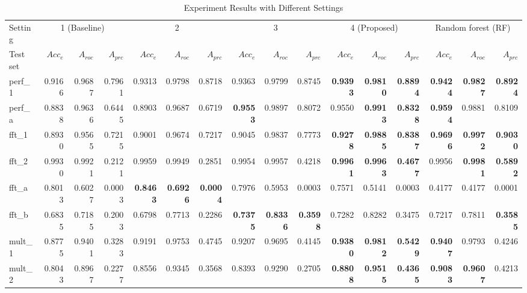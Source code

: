 \documentclass[10pt, final, letter, twocolumns]{IEEEtran}
\begin{document}
\begin{table}
\scriptsize
\centering
\caption{Experiment Results with Different Settings}\vspace{-3mm}
\label{tab:results}
\begin{tabular}{l|rrr|rrr|rrr|rrr||rrr}
\toprule
Setting & \multicolumn{3}{c|}{1 (Baseline)} & \multicolumn{3}{c|}{2} & \multicolumn{3}{c|}{3} & \multicolumn{3}{c||}{4 (Proposed)} & \multicolumn{3}{c}{Random forest (RF)}\\
Test set & $Acc_{e}$ & $A_{roc}$ & $A_{prc}$ & $Acc_{e}$ & $A_{roc}$ & $A_{prc}$ & $Acc_{e}$ & $A_{roc}$ & $A_{prc}$ & $Acc_{e}$ & $A_{roc}$ & $A_{prc}$ & $Acc_{e}$ & $A_{roc}$ & $A_{prc}$ \\
\midrule
perf\_1 & 0.9166&       0.9687& 0.7961& 0.9313& 0.9798& 0.8718  &0.9363&        0.9799& 0.8745  &{\bf 0.9393} &{\bf 0.9810}   &{\bf 0.8894} & {\bf 0.9424}& {\bf 0.9827}&   {\bf 0.8924}\\
perf\_a & 0.8838&       0.9636& 0.6445& 0.8903& 0.9687& 0.6719& {\bf 0.9553}    &0.9897&        0.8072& 0.9550  &{\bf 0.9913}&        {\bf 0.8328} & {\bf 0.9594}  &0.9881 &       0.8109\\
fft\_1 & 0.8930 &       0.9565  &0.7215 &0.9001 &0.9674 &0.7217 &0.9045 &0.9837 &0.7773 &{\bf 0.9278}&        {\bf 0.9885}    &{\bf 0.8387} & {\bf 0.9696}   & {\bf 0.9972}  & {\bf 0.9030}\\
fft\_2 & 0.9930 &0.9921 &0.2121 &0.9959 &0.9949 &0.2851 &0.9954 &0.9957 &0.4218 &{\bf 0.9961} &{\bf 0.9963}   &{\bf 0.4677} & 0.9956 & {\bf 0.9981}  & {\bf 0.5892}\\
fft\_a & 0.8013 &0.6027 &0.0003 &{\bf 0.8463} & {\bf 0.6926}    &{\bf 0.0004} &       0.7976 &        0.5953  &0.0003 &0.7571 &       0.5141 &        0.0003 & 0.4177 &       0.4177& 0.0001\\
fft\_b & 0.6835&        0.7185& 0.2003& 0.6798& 0.7713& 0.2286& {\bf 0.7375}&   {\bf 0.8336}&        {\bf 0.3598} &  0.7282& 0.8282  &0.3475 & 0.7217 & 0.7811 &      {\bf 0.3585}\\
mult\_1 & 0.8775        & 0.9401 &      0.3283  &0.9191&        0.9753  &0.4745 &0.9207 &0.9695&        0.4145& {\bf 0.9380}&        {\bf 0.9812}    &{\bf 0.5429} & {\bf 0.9407}  & 0.9793        & 0.4246\\
mult\_2 & 0.8043        &0.8967 &0.2277 &0.8556 &0.9345 &0.3568 &0.8393 &0.9290 &0.2705 &{\bf 0.8808} &{\bf 0.9515}   &{\bf 0.4365} & {\bf 0.9083} & {\bf 0.9607} & 0.4213\\

\end{tabular}
\end{table}
\end{document}
